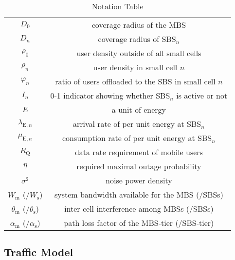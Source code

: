 \documentclass[12pt, draftclsnofoot,onecolumn]{IEEEtran}
\begin{document}
\begin{table}
\center
\caption{Notation Table}
\begin{tabular}{c|c}
  \hline
  \hline
  $D_0$ & coverage radius of the MBS\\  
  $D_{n}$ & coverage radius of SBS$_n$\\
  $\rho_0$ & user density outside of all small cells\\
  $\rho_{n}$ & user density in small cell $n$\\
  $\varphi_n$ & ratio of users offloaded to the SBS in small cell $n$\\
  $I_n$ & 0-1 indicator showing whether SBS$_n$ is active or not\\
  $E$ & a unit of energy\\
  $\lambda_{\mathrm{E},n}$ & arrival rate of per unit energy at SBS$_n$\\
  $\mu_{\mathrm{E},n}$ & consumption rate of per unit energy at SBS$_n$\\
  $R_\mathrm{Q}$ & data rate requirement of mobile users\\
  $\eta$ & required maximal outage probability\\
  $\sigma^2$ & noise power density\\
  $W_\mathrm{m}$ (/$W_\mathrm{s}$) & system bandwidth available for the MBS (/SBSs)\\
  $\theta_\mathrm{m}$ (/$\theta_\mathrm{s}$) & inter-cell interference among MBSs (/SBSs)\\
  $\alpha_\mathrm{m}$ (/$\alpha_\mathrm{s}$) & path loss factor of the MBS-tier (/SBS-tier)\\
  \hline
  \hline
\end{tabular}
\label{tab_P_BS}
\end{table}

\subsection{Traffic Model}
\end{document}
